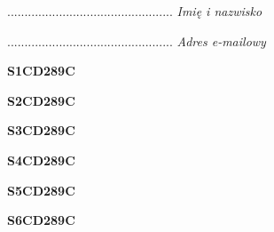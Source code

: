 \begin{turn}{90}\begin{minipage}{\linewidth} \vspace{20mm} ................................................  \textit{Imię i nazwisko}\end{minipage}\end{turn}

\begin{turn}{90}\begin{minipage}{\linewidth} \vspace{20mm} ................................................  \textit{Adres e-mailowy}\end{minipage}\end{turn}

\begin{turn}{90}\huge \begin{minipage}{\linewidth} \vspace{10mm}\textbf{S1CD289C}\end{minipage}\end{turn}

\begin{turn}{90}\huge \begin{minipage}{\linewidth} \vspace{10mm}\textbf{S2CD289C}\end{minipage}\end{turn}

\begin{turn}{90}\huge \begin{minipage}{\linewidth} \vspace{10mm}\textbf{S3CD289C}\end{minipage}\end{turn}

\begin{turn}{90}\huge \begin{minipage}{\linewidth} \vspace{10mm}\textbf{S4CD289C}\end{minipage}\end{turn}

\begin{turn}{90}\huge \begin{minipage}{\linewidth} \vspace{10mm}\textbf{S5CD289C}\end{minipage}\end{turn}

\begin{turn}{90}\huge \begin{minipage}{\linewidth} \vspace{10mm}\textbf{S6CD289C}\end{minipage}\end{turn}

